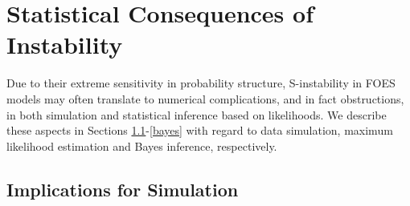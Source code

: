 \documentclass[]{article}
\theoremstyle{definition}
\begin{document}
\section{Statistical Consequences of Instability}\label{implications}

Due to their extreme sensitivity in probability structure, S-instability
in FOES models may often translate to numerical complications, and in
fact obstructions, in both simulation and statistical inference based on
likelihoods. We describe these aspects in Sections
\ref{mcmc}-\ref{bayes} with regard to data simulation, maximum
likelihood estimation and Bayes inference, respectively.

\subsection{Implications for Simulation}\label{mcmc}
\end{document}
